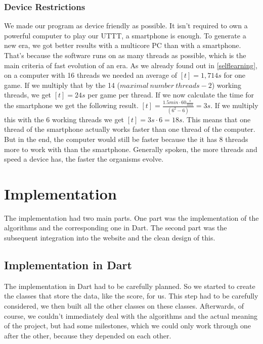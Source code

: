 \subsubsection{Device Restrictions}
We made our program as device friendly as possible. It isn't required to own a powerful computer to play our \ac{UTTT}, a smartphone is enough. To generate a new era, we got better results with a multicore PC than with a smartphone. That's because the software runs on as many threads as possible, which is the main criteria of fast evolution of an era. 
As we already found out in \autoref{selflearning}, on a computer with 16 threads we needed an average of $[t] = 1,714s$ for one game. If we multiply that by the 14 ($maximal\ number\ threads - 2$) working threads, we get $[t] = 24 s$ per game per thread.
If we now calculate the time for the smartphone we get the following result. $ [t] = \frac{1.5min \cdot 60\frac{s}{min}}{(6^2 - 6)} = 3s$. If we multiply this with the 6 working threads we get $[t] = 3s \cdot 6 = 18s$. This means that one thread of the smartphone actually works faster than one thread of the computer. But in the end, the computer would still be faster because the it has 8 threads more to work with than the smartphone.  Generally spoken, the more threads and speed a device has, the faster the organisms evolve.


\section{Implementation}
The implementation had two main parts. One part was the implementation of the algorithms and the corresponding one in Dart. The second part was the subsequent integration into the website and the clean design of this.

\subsection{Implementation in Dart}
The implementation in Dart had to be carefully planned. So we started to create the classes that store the data, like the score, for us. This step had to be carefully considered, we then built all the other classes on these classes. Afterwards, of course, we couldn't immediately deal with the algorithms and the actual meaning of the project, but had some milestones, which we could only work through one after the other, because they depended on each other.

